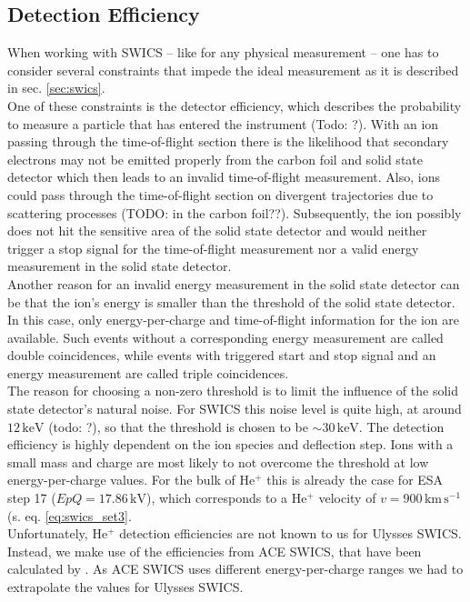\subsection{Detection Efficiency}
When working with SWICS -- like for any physical measurement -- one has to consider several constraints that impede the ideal measurement as it is described in sec. \ref{sec:swics}. \\
One of these constraints is the detector efficiency, which describes the probability to measure a particle that has entered the instrument (Todo: ?). 
With an ion passing through the time-of-flight section there is the likelihood that secondary electrons may not be emitted properly from the carbon foil and solid state detector which then leads to an invalid time-of-flight measurement. Also, ions could pass through the time-of-flight section on divergent trajectories due to scattering processes (TODO: in the carbon foil??). Subsequently, the ion possibly does not hit the sensitive area of the solid state detector and would neither trigger a stop signal for the time-of-flight measurement nor a valid energy measurement in the solid state detector.\\
Another reason for an invalid energy measurement in the solid state detector can be that the ion's energy is smaller than the threshold of the solid state detector. In this case, only energy-per-charge and time-of-flight information for the ion are available. Such events without a corresponding energy measurement are called double coincidences, while events with triggered start and stop signal and an energy measurement are called triple coincidences.\\
The reason for choosing a non-zero threshold is to limit the influence of the solid state detector's natural noise. For SWICS this noise level is quite high, at around $12\,\mathrm{keV}$ \citep{gloeckler_1992} (todo: ?), so that the threshold is chosen to be $\sim 30 \, \mathrm{keV}$. 
The detection efficiency is highly dependent on the ion species and deflection step.
Ions with a small mass and charge are most likely to not overcome the threshold at low energy-per-charge values. For the bulk of $\mathrm{He^{+}}$ this is already the case for ESA step 17 ($EpQ = 17.86\,\mathrm{kV}$), which corresponds to a $\mathrm{He^{+}}$ velocity of $v = 900\,\mathrm{km\,s^{-1}}$ (s. eq. \ref{eq:swics_set3}.\\
Unfortunately, $\mathrm{He^{+}}$ detection efficiencies are not known to us for Ulysses SWICS. Instead, we make use of the efficiencies from ACE SWICS, that have been calculated by \citet{koeten}. As ACE SWICS uses different energy-per-charge ranges we had to extrapolate the values for Ulysses SWICS.
